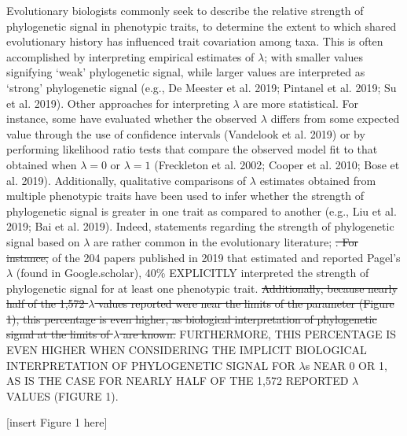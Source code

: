 \documentclass[
]{article}
\begin{document}
Evolutionary biologists commonly seek to describe the relative strength
of phylogenetic signal in phenotypic traits, to determine the extent to
which shared evolutionary history has influenced trait covariation among
taxa. This is often accomplished by interpreting empirical estimates of
\(\lambda\); with smaller values signifying `weak' phylogenetic signal,
while larger values are interpreted as `strong' phylogenetic signal
(e.g., De Meester et al. 2019; Pintanel et al. 2019; Su et al. 2019).
Other approaches for interpreting \(\lambda\) are more statistical. For
instance, some have evaluated whether the observed \(\lambda\) differs
from some expected value through the use of confidence intervals
(Vandelook et al. 2019) or by performing likelihood ratio tests that
compare the observed model fit to that obtained when \(\lambda=0\) or
\(\lambda=1\) (Freckleton et al. 2002; Cooper et al. 2010; Bose et al.
2019). Additionally, qualitative comparisons of \(\lambda\) estimates
obtained from multiple phenotypic traits have been used to infer whether
the strength of phylogenetic signal is greater in one trait as compared
to another (e.g., Liu et al. 2019; Bai et al. 2019). Indeed, statements
regarding the strength of phylogenetic signal based on \(\lambda\) are
rather common in the evolutionary literature; \sout{. For instance,} of
the 204 papers published in 2019 that estimated and reported Pagel's
\(\lambda\) (found in Google.scholar), 40\% EXPLICITLY interpreted the
strength of phylogenetic signal for at least one phenotypic trait.
\sout{Additionally, because nearly half of the 1,572 \(\lambda\) values
reported were near the limits of the parameter (Figure 1), this
percentage is even higher, as biological interpretation of phylogenetic
signal at the limits of \(\lambda\) are known.} FURTHERMORE, THIS
PERCENTAGE IS EVEN HIGHER WHEN CONSIDERING THE IMPLICIT BIOLOGICAL
INTERPRETATION OF PHYLOGENETIC SIGNAL FOR \(\lambda\)s NEAR 0 OR 1, AS
IS THE CASE FOR NEARLY HALF OF THE 1,572 REPORTED \(\lambda\) VALUES
(FIGURE 1). \hfill\break

{[}insert Figure 1 here{]} \hfill\break
\end{document}
